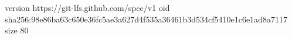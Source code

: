version https://git-lfs.github.com/spec/v1
oid sha256:98e86ba63c650e36fc5ae3a627d4f535a36461b3d534cf5410e1c6e1ad8a7117
size 80
